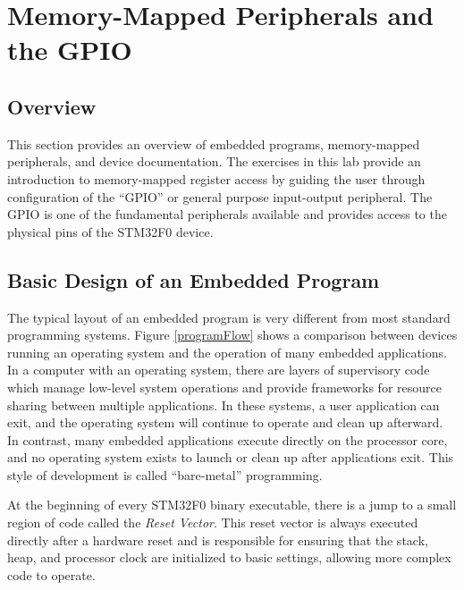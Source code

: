 \documentclass[11pt,fleqn]{book} %
\begin{document}
\chapter{Memory-Mapped Peripherals and the GPIO}

\section{Overview}
This section provides an overview of embedded programs, memory-mapped peripherals, and device documentation. The exercises in this lab provide an introduction to memory-mapped register access by guiding the user through configuration of the ``GPIO'' or general purpose input-output peripheral. The GPIO is one of the fundamental peripherals available and provides access to the physical pins of the STM32F0 device. 


\section{Basic Design of an Embedded Program}


The typical layout of an embedded program is very different from most standard programming systems. Figure \ref{programFlow} shows a comparison between devices running an operating system and the operation of many embedded applications. 
In a computer with an operating system, there are layers of supervisory code which manage low-level system operations and provide frameworks for resource sharing between multiple applications. In these systems, a user application can exit, and the operating system will continue to operate and clean up afterward. In contrast, many embedded applications execute directly on the processor core, and no operating system exists to launch or clean up after applications exit. This style of development is called ``bare-metal'' programming. 

At the beginning of every STM32F0 binary executable, there is a jump to a small region of code called the \textit{Reset Vector}. This reset vector is always executed directly after a hardware reset and is responsible for ensuring that the stack, heap, and processor clock are initialized to basic settings, allowing more complex code to operate.
\end{document}
